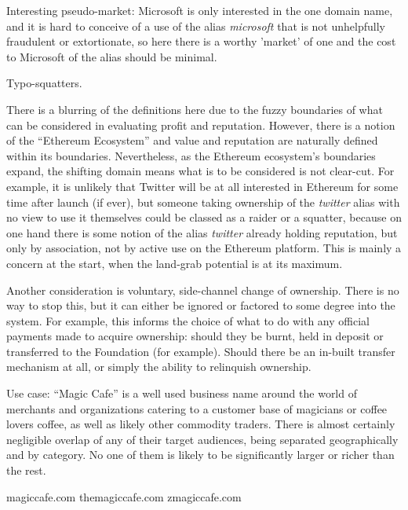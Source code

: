 \documentclass[10pt,a4paper]{article}
\begin{document}
Interesting pseudo-market: Microsoft is only interested in the one domain name, and it is hard to conceive of a use of the alias {\it microsoft} that is not unhelpfully fraudulent or extortionate, so here there is a worthy 'market' of one and the cost to Microsoft of the alias should be minimal.

Typo-squatters.

There is a blurring of the definitions here due to the fuzzy boundaries of what can be considered in evaluating profit and reputation. However, there is a notion of the ``Ethereum Ecosystem'' and value and reputation are naturally defined within its boundaries. Nevertheless, as the Ethereum ecosystem's boundaries expand, the shifting domain means what is to be considered is not clear-cut. For example, it is unlikely that Twitter will be at all interested in Ethereum for some time after launch (if ever), but someone taking ownership of the {\it twitter} alias with no view to use it themselves could be classed as a raider or a squatter, because on one hand there is some notion of the alias {\it twitter} already holding reputation, but only by association, not by active use on the Ethereum platform. This is mainly a concern at the start, when the land-grab potential is at its maximum.

Another consideration is voluntary, side-channel change of ownership. There is no way to stop this, but it can either be ignored or factored to some degree into the system. For example, this informs the choice of what to do with any official payments made to acquire ownership: should they be burnt, held in deposit or transferred to the Foundation (for example). Should there be an in-built transfer mechanism at all, or simply the ability to relinquish ownership.

Use case: ``Magic Cafe'' is a well used business name around the world of merchants and organizations catering to a customer base of magicians or coffee lovers coffee, as well as likely other commodity traders. There is almost certainly negligible overlap of any of their target audiences, being separated geographically and by category. No one of them is likely to be significantly larger or richer than the rest.

magiccafe.com
themagiccafe.com
zmagiccafe.com
\end{document}
